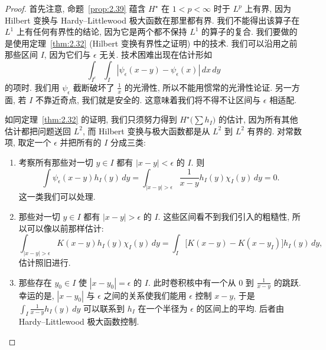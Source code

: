 \begin{proof}
首先注意, 命题~\ref{prop:2.39} 蕴含 $H^{\star}$ 在 $1<p<\infty$ 时于 $L^p$ 上有界, 因为 Hilbert 变换与 Hardy--Littlewood 极大函数在那里都有界. 我们不能得出该算子在 $L^1$ 上有任何有界性的结论, 因为它是两个都不保持 $L^1$ 的算子的复合. 我们要做的是使用定理~\ref{thm:2.32} (Hilbert 变换有界性之证明) 中的技术. 我们可以沿用之前那些区间 $I$, 因为它们与 $\epsilon$ 无关. 技术困难出现在估计形如
\[
\int_{I^{c}}\int_{I}|\psi_{\epsilon}(x-y)-\psi_{\epsilon}(x)|\,dx\,dy
\]
的项时. 我们用 $\psi_{\epsilon}$ 截断破坏了 $\frac{1}{x}$ 的光滑性, 所以不能用惯常的光滑性论证. 另一方面, 若 $I$ 不靠近奇点, 我们就是安全的. 这意味着我们将不得不让区间与 $\epsilon$ 相适配.

如同定理~\ref{thm:2.32} 的证明, 我们只须努力得到 $H^{\star}\bigl(\sum h_I\bigr)$ 的估计, 因为所有其他估计都把问题送回 $L^2$, 而 Hilbert 变换与极大函数都是从 $L^2$ 到 $L^2$ 有界的. 对常数项, 取定一个 $\epsilon$ 并把所有的 $I$ 分成三类:

\begin{enumerate}[label=\alph*)]
\item 考察所有那些对一切 $y\in I$ 都有 $|x-y|<\epsilon$ 的 $I$. 则
\[
\int\psi_{\epsilon}(x-y)h_{I}(y)\,dy=\int_{|x-y|>\epsilon}\frac{1}{x-y}h_{I}(y)\chi_{I}(y)\,dy=0.
\]
这一类我们可以处理.
\item 那些对一切 $y\in I$ 都有 $|x-y|>\epsilon$ 的 $I$. 这些区间看不到我们引入的粗糙性, 所以可以像以前那样估计:
\[
\int_{|x-y|>\epsilon}K(x-y)h_{I}(y)\chi_{I}(y)\,dy
=\int_{I}\bigl[K(x-y)-K(x-y_{I})\bigr]h_{I}(y)\,dy,
\]
估计照旧进行.
\item 那些存在 $y_0\in I$ 使 $|x-y_0|=\epsilon$ 的 $I$. 此时卷积核中有一个从 $0$ 到 $\frac{1}{x-y}$ 的跳跃. 幸运的是, $|x-y_0|$ 与 $\epsilon$ 之间的关系使我们能用 $\epsilon$ 控制 $x-y$, 于是 $\int_I\frac{1}{x-y}h_I(y)\,dy$ 可以联系到 $h_I$ 在一个半径为 $\epsilon$ 的区间上的平均. 后者由 Hardy--Littlewood 极大函数控制.
\end{enumerate}


\end{proof}
